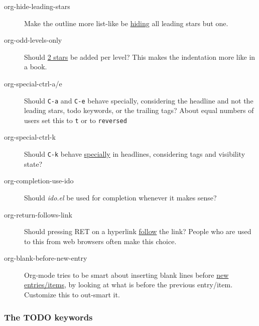 \documentclass[11pt]{article}
\begin{document}
\begin{description}
\item[{org-hide-leading-stars}] Make the outline more list-like be \href{http://orgmode.org/manual/Clean-view.html\#Clean-view}{hiding}
all leading stars but one.

\item[{org-odd-levels-only}] Should \href{http://orgmode.org/manual/Clean-view.html\#Clean-view}{2 stars} be added per level?  This
makes the indentation more like in a book.

\item[{org-special-ctrl-a/e}] Should \texttt{C-a} and \texttt{C-e} behave specially,
considering the headline and not the leading stars, todo
keywords, or the trailing tags?  About equal numbers of users set
this to \texttt{t} or to \texttt{reversed}

\item[{org-special-ctrl-k}] Should \texttt{C-k} behave \href{http://orgmode.org/worg/org-faq.html\#C-k-is-killing-subtrees}{specially} in headlines,
considering tags and visibility state?

\item[{org-completion-use-ido}] Should \emph{ido.el} be used for completion
whenever it makes sense?

\item[{org-return-follows-link}] Should pressing RET on a hyperlink \href{http://orgmode.org/manual/Handling-links.html\#Handling-links}{follow}
the link?  People who are used to this from web browsers often
make this choice.

\item[{org-blank-before-new-entry}] Org-mode tries to be smart about
inserting blank lines before \href{http://orgmode.org/manual/Structure-editing.html\#Structure-editing}{new entries/items}, by looking at
what is before the previous entry/item.  Customize this to
out-smart it.
\end{description}

\subsubsection*{The TODO keywords}
\label{sec:org86607b9}

\end{document}
